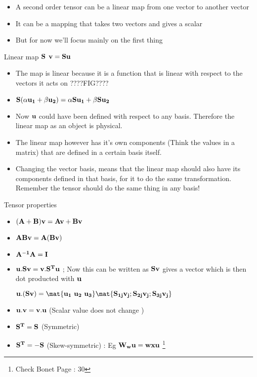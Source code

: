	\begin{frame}
		\begin{itemize}
			\item A second order tensor can be a linear map from one vector to another vector
			\item It can be a mapping that takes two vectors and gives a scalar			
			\item But for now we'll focus mainly on the first thing
		\end{itemize}
	
		\begin{block}{Linear map $\mathbf{S}$}
			$\mathbf{v = Su}$
		\end{block}
	
	\end{frame}

	\begin{frame}
		\begin{itemize}
			\item The map is linear because it is a function that is linear with respect to the vectors it acts on ????FIG????
			\item $\mathbf{S(\alpha u_1 + \beta u_2) = \alpha Su_1 + \beta  Su_2}$
			
			\item Now $\mathbf{u}$ could have been defined with respect to any basis. Therefore the linear map as an object is physical.
			
			\item The linear map however has it's own components (Think the values in a matrix) that are defined in a certain basis itself. 
			
			\item Changing the vector basis, means that the linear map should also have its components defined in that basis, for it to do the same transformation. Remember the tensor should do the same thing in any basis! 			
		\end{itemize}
	\end{frame}


	\begin{frame}{Tensor properties}
		\begin{itemize}
			\item $\mathbf{(A+B)v =  Av + Bv}$
			\item $\mathbf{ABv = A(Bv)}$
			\item $\mathbf{A^{-1}A = I}$
			\item $\mathbf{u.Sv = v.S^Tu}$  ; Now this can be written as $\mathbf{Sv}$ gives a vector which is then dot producted with $\mathbf{u}$ 
			
			$\ve{u . (Sv) = \mat{u_1~u_2~u_3} \mat{S_{1j}v_j;S_{2j}v_j;S_{3j}v_j}}$
			
			\item $\mathbf{u.v = v.u}$ (Scalar value does not change
			)
			\item $\mathbf{S^{T} =  S}$ (Symmetric)
			\item $\mathbf{S^{T} =  -S}$ (Skew-symmetric) : Eg $\mathbf{W_w u = w x u}$ \footnote{Check Bonet Page : 30}
		\end{itemize}
	\end{frame}

